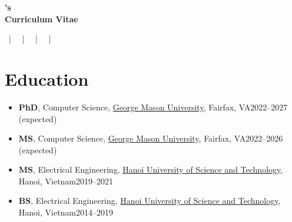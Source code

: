 \documentclass[11pt]{article}
\begin{document}
\thispagestyle{empty}

\begin{center}
    \textbf{\LARGE \myname{}'s\\\vspace{0.15in}Curriculum Vitae}
\end{center}

\begin{center}
    \myaddress ~|~ \myemailwork ~|~ \myphone ~|~ \mygooglescholar ~|~ \mywebsite 
\end{center}

\section{Education}
    \begin{itemize}
        \item \textbf{PhD}, Computer Science,  \href{https://www.gmu.edu}{George Mason University}, Fairfax, VA\hfill 2022--2027 (expected)

        \item \textbf{MS}, Computer Science,  \href{https://www.gmu.edu}{George Mason University}, Fairfax, VA\hfill 2022--2026 (expected)
        
        \item \textbf{MS}, Electrical Engineering, \href{https://www.hust.edu.vn/en/}{Hanoi University of Science and Technology}, Hanoi, Vietnam\hfill 2019--2021
        
        \item \textbf{BS}, Electrical Engineering, \href{https://www.hust.edu.vn/en/}{Hanoi University of Science and Technology}, Hanoi, Vietnam\hfill 2014--2019
    \end{itemize}
\end{document}
